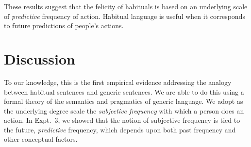 \documentclass[10pt,letterpaper]{article}
\begin{document}


%
%
%
%

These results suggest that the felicity of habituals is based on an underlying scale of \emph{predictive} frequency of action.
Habitual language is useful when it corresponds to future predictions of people's actions.



\section{Discussion}

To our knowledge, this is the first empirical evidence addressing the analogy between habitual sentences and generic sentences.
We are able to do this using a formal theory of the semantics and pragmatics of generic language.
We adopt as the underlying degree scale the \emph{subjective frequency} with which a person does an action. 
In Expt.~3, we showed that the notion of subjective frequency is tied to the future, \emph{predictive} frequency, which depends upon both past frequency and other conceptual factors.
\end{document}
